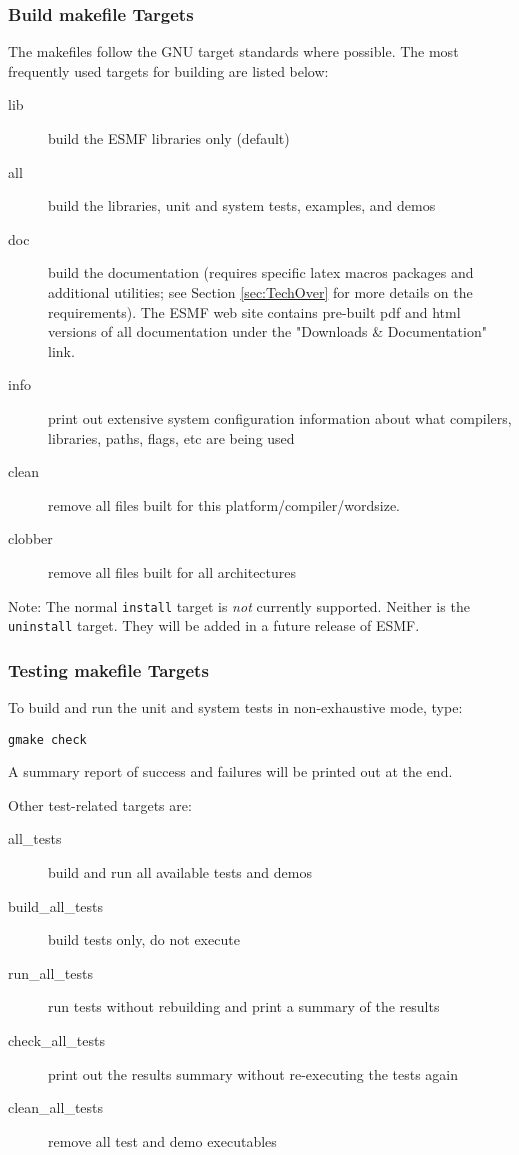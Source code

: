 \subsubsection{Build makefile Targets}

The makefiles follow the GNU target standards where possible.
The most frequently used targets for building are listed below:
\begin{description}
\item[lib] build the ESMF libraries only (default)
\item[all] build the libraries, unit and system tests, examples, and demos
\item[doc] build the documentation (requires specific latex macros packages
and additional utilities; see Section \ref{sec:TechOver} for more details
on the requirements).  The ESMF web site 
contains pre-built pdf and html versions of all documentation
under the "Downloads \& Documentation" link.
\item[info] print out extensive system configuration information about what
           compilers, libraries, paths, flags, etc are being used
\item[clean] remove all files built for this platform/compiler/wordsize.
\item[clobber] remove all files built for all architectures
\end{description}

Note: The normal {\tt install} target is {\it not} currently supported.  
Neither is the {\tt uninstall} target.  
They will be added in a future release of ESMF.



\subsubsection{Testing makefile Targets}

To build and run the unit and system tests in non-exhaustive mode, type:
\begin{verbatim}
gmake check
\end{verbatim}
A summary report of success and failures will be printed out at the end.

\noindent Other test-related targets are:
\begin{description}
\item[all\_tests] build and run all available tests and demos
\item[build\_all\_tests] build tests only, do not execute
\item[run\_all\_tests] run tests without rebuilding and print a
summary of the results
\item[check\_all\_tests] 
print out the results summary without re-executing the tests again
\item[clean\_all\_tests] remove all test and demo executables 
\end{description}

